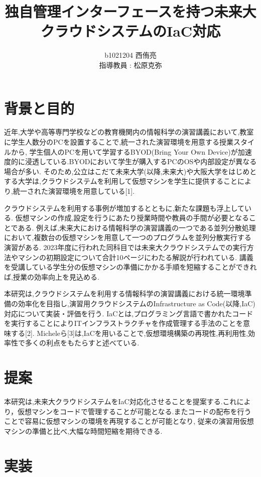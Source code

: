 \documentclass[11pt]{ujarticle}\sloppy
\author{%
b1021204 西侑亮\\指導教員 : 松原克弥
}
\title{独自管理インターフェースを持つ未来大クラウドシステムのIaC対応}
\begin{document}
\maketitle


\section{背景と目的}
\label{sec:intro}
近年,大学や高等専門学校などの教育機関内の情報科学の演習講義において,教室に学生人数分のPCを設置することで,統一された演習環境を用意する授業スタイルから,
学生個人のPCを用いて学習するBYOD(Bring Your Own Device)が加速度的に浸透している.BYODにおいて学生が購入するPCのOSや内部設定が異なる場合が多い.
そのため,公立はこだて未来大学(以降,未来大)や大阪大学をはじめとする大学は,クラウドシステムを利用して仮想マシンを学生に提供することにより,統一された演習環境を用意している[1].


クラウドシステムを利用する事例が増加するとともに,新たな課題も浮上している.
仮想マシンの作成,設定を行うにあたり授業時間や教員の手間が必要となることである.
例えば,未来大における情報科学の演習講義の一つである並列分散処理において,複数台の仮想マシンを用意して一つのプログラムを並列分散実行する演習がある.
2023年度に行われた同科目では未来大クラウドシステムでの実行方法やマシンの初期設定について合計10ページにわたる解説が行われている.
講義を受講している学生分の仮想マシンの準備にかかる手順を短縮することができれば,授業の効率向上を見込める.


本研究は,クラウドシステムを利用する情報科学の演習講義における統一環境準備の効率化を目指し,演習用クラウドシステムのInfrastructure as Code(以降,IaC)対応について実装・評価を行う.
IaCとは,プログラミング言語で書かれたコードを実行することによりITインフラストラクチャを作成管理する手法のことを意味する[2].
Micheleら[3]は,IaCを用いることで,仮想環境構築の再現性,再利用性,効率性で多くの利点をもたらすと述べている.



\section{提案}


本研究は,未来大クラウドシステムをIaC対応化させることを提案する.これにより，仮想マシンをコードで管理することが可能となる.またコードの配布を行うことで容易に仮想マシンの環境を再現することが可能となり,
従来の演習用仮想マシンの準備と比べ,大幅な時間短縮を期待できる.


\section{実装}
\end{document}
